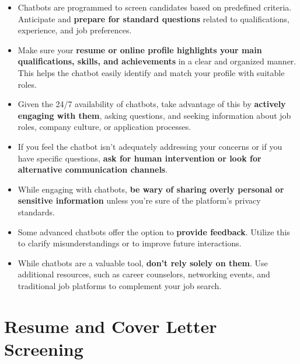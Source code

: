 \documentclass[
]{book}
\providecommand{\tightlist}{%
  \setlength{\itemsep}{0pt}\setlength{\parskip}{0pt}}
\begin{document}
\begin{itemize}
\tightlist
\item
  Chatbots are programmed to screen candidates based on predefined criteria. Anticipate and \textbf{prepare for standard questions} related to qualifications, experience, and job preferences.
\end{itemize}

\begin{itemize}
\tightlist
\item
  Make sure your \textbf{resume or online profile highlights your main qualifications, skills, and achievements} in a clear and organized manner. This helps the chatbot easily identify and match your profile with suitable roles.
\end{itemize}

\begin{itemize}
\tightlist
\item
  Given the 24/7 availability of chatbots, take advantage of this by \textbf{actively engaging with them}, asking questions, and seeking information about job roles, company culture, or application processes.
\end{itemize}

\begin{itemize}
\item
  If you feel the chatbot isn't adequately addressing your concerns or if you have specific questions, \textbf{ask for human intervention or look for alternative communication channels}.
\item
  While engaging with chatbots, \textbf{be wary of sharing overly personal or sensitive information} unless you're sure of the platform's privacy standards.
\end{itemize}

\begin{itemize}
\item
  Some advanced chatbots offer the option to \textbf{provide feedback}. Utilize this to clarify misunderstandings or to improve future interactions.
\item
  While chatbots are a valuable tool, \textbf{don't rely solely on them}. Use additional resources, such as career counselors, networking events, and traditional job platforms to complement your job search.
\end{itemize}

\hypertarget{resume-and-cover-letter-screening}{%
\chapter{Resume and Cover Letter Screening}\label{resume-and-cover-letter-screening}}
\end{document}
